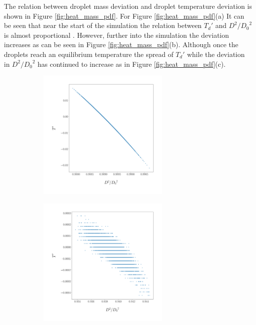 \documentclass[../Interim_Report_Master]{subfiles}
\begin{document}
The relation between droplet mass deviation and droplet temperature deviation is shown in Figure \ref{fig:heat_mass_pdf}. For Figure \ref{fig:heat_mass_pdf}(a) It can be seen that near the start of the simulation the relation between ${T_d}'$ and $D^2/{D_0}^2$ is almost proportional . However, further into the simulation the deviation increases as can be seen in Figure \ref{fig:heat_mass_pdf}(b). Although once the droplets reach an equilibrium temperature the spread of ${T_d}'$ while the deviation in $D^2/{D_0}^2$ has continued to increase as in Figure \ref{fig:heat_mass_pdf}(c).
\begin{figure}[H]
	\centering
	\begin{subfigure}{\textwidth}
		\centering
		\includegraphics[width=0.7\textwidth]{./Diagrams/Temp_Mass_PDFs_timestep_8.png}
		\caption{}
	\end{subfigure}
\end{figure}
\begin{figure}\ContinuedFloat
	\centering
	\begin{subfigure}{\textwidth}
		\centering
		\includegraphics[width=0.7\textwidth]{./Diagrams/Temp_Mass_PDFs_timestep_80.png}
		\caption{}
	\end{subfigure}
\end{figure}
\end{document}
